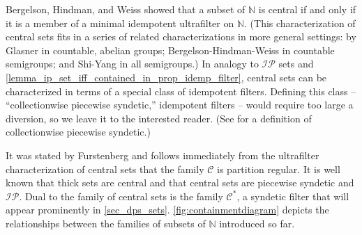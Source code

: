 \documentclass[letter,11pt]{article}
\theoremstyle{plain}
\theoremstyle{definition}
\theoremstyle{plain}
\theoremstyle{plain}
\numberwithin{equation}{section}
\newcommand{\N}{\mathbb{N}}
\newcommand{\central}{\mathcal{C}}
\newcommand{\IP}{\mathcal{IP}}
\begin{document}
Bergelson, Hindman, and Weiss \cite{bergelson_hindman_1990} showed that a subset of $\N$ is central if and only if it is a member of a minimal idempotent ultrafilter on $\N$.  (This characterization of central sets fits in a series of related characterizations in more general settings: by Glasner \cite{glasner_1980} in countable, abelian groups; Bergelson-Hindman-Weiss \cite{bergelson_hindman_1990} in countable semigroups; and Shi-Yang \cite{shi_yang_1996} in all semigroups.) In analogy to $\IP$ sets and \cref{lemma_ip_set_iff_contained_in_prop_idemp_filter}, central sets can be characterized in terms of a special class of idempotent filters.  Defining this class -- ``collectionwise piecewise syndetic,'' idempotent filters -- would require too large a diversion, so we leave it to the interested reader. (See \cite[Def. 14.19]{hindman_strauss_book_2012} for a definition of collectionwise piecewise syndetic.)

It was stated by Furstenberg and follows immediately from the ultrafilter characterization of central sets that the family $\central$ is partition regular. It is well known that thick sets are central and that central sets are piecewise syndetic and $\IP$.  Dual to the family of central sets is the family $\central^*$, a syndetic filter that will appear prominently in \cref{sec_dps_sets}. \cref{fig:containmentdiagram} depicts the relationships between the families of subsets of $\N$ introduced so far.
\end{document}
